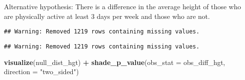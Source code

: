 \documentclass[
]{article}
\newenvironment{Shaded}{\begin{snugshade}}{\end{snugshade}}
\newcommand{\DataTypeTok}[1]{\textcolor[rgb]{0.13,0.29,0.53}{#1}}
\newcommand{\DecValTok}[1]{\textcolor[rgb]{0.00,0.00,0.81}{#1}}
\newcommand{\KeywordTok}[1]{\textcolor[rgb]{0.13,0.29,0.53}{\textbf{#1}}}
\newcommand{\NormalTok}[1]{#1}
\newcommand{\OperatorTok}[1]{\textcolor[rgb]{0.81,0.36,0.00}{\textbf{#1}}}
\newcommand{\StringTok}[1]{\textcolor[rgb]{0.31,0.60,0.02}{#1}}
\begin{document}
Alternative hypothesis: There is a difference in the average height of
those who are physically active at least 3 days per week and those who
are not.

\begin{Shaded}
\end{Shaded}

\begin{verbatim}
## Warning: Removed 1219 rows containing missing values.
\end{verbatim}

\begin{Shaded}
\end{Shaded}

\begin{verbatim}
## Warning: Removed 1219 rows containing missing values.
\end{verbatim}

\begin{Shaded}
\begin{Highlighting}[]
\KeywordTok{visualize}\NormalTok{(null_dist_hgt) }\OperatorTok{+}\StringTok{ }
\StringTok{  }\KeywordTok{shade_p_value}\NormalTok{(}\DataTypeTok{obs_stat =}\NormalTok{ obs_diff_hgt, }\DataTypeTok{direction =} \StringTok{"two_sided"}\NormalTok{)}
\end{Highlighting}
\end{Shaded}
\end{document}
